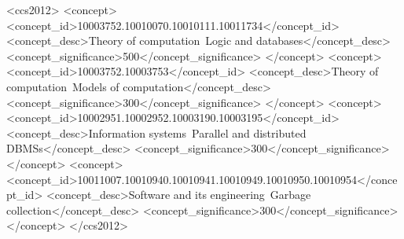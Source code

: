 \documentclass{sig-alternate-05-2015}
\numberwithin{equation}{section}
\begin{document}
\maketitle




%
%
\begin{CCSXML}
<ccs2012>
<concept>
<concept_id>10003752.10010070.10010111.10011734</concept_id>
<concept_desc>Theory of computation~Logic and databases</concept_desc>
<concept_significance>500</concept_significance>
</concept>
<concept>
<concept_id>10003752.10003753</concept_id>
<concept_desc>Theory of computation~Models of computation</concept_desc>
<concept_significance>300</concept_significance>
</concept>
<concept>
<concept_id>10002951.10002952.10003190.10003195</concept_id>
<concept_desc>Information systems~Parallel and distributed DBMSs</concept_desc>
<concept_significance>300</concept_significance>
</concept>
<concept>
<concept_id>10011007.10010940.10010941.10010949.10010950.10010954</concept_id>
<concept_desc>Software and its engineering~Garbage collection</concept_desc>
<concept_significance>300</concept_significance>
</concept>
</ccs2012>
\end{CCSXML}



%
%

%
%
\printccsdesc




























\balancecolumns


\newpage\onecolumn
\appendix







\end{document}
